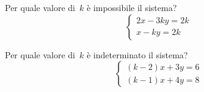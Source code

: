 \begin{esercizio}
 \label{ese:22.37}
Per quale valore di~\(k\) è impossibile il sistema?
\[\left\{\begin{array}{l}2x-3ky=2k\\x-ky=2k \end{array}\right.\]
\end{esercizio}

\begin{esercizio}
 \label{ese:22.38}
Per quale valore di~\(k\) è indeterminato il sistema?
\[\left\{\begin{array}{l}(k-2)x+3y=6 \\(k-1)x+4y=8 \end{array}\right.\]
\end{esercizio}

